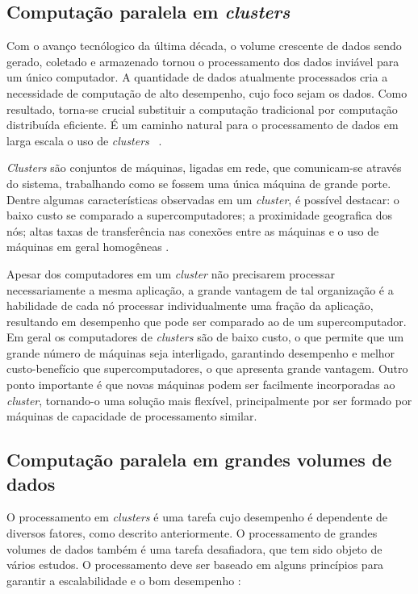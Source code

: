 \subsection{Computação paralela em \textit{clusters}}
Com o avanço tecnólogico da última década, o volume crescente de dados sendo gerado, coletado e armazenado tornou o processamento dos dados inviável para um único computador. A quantidade de dados atualmente processados cria a necessidade de computação de alto desempenho, cujo foco sejam os dados.  Como resultado, torna-se crucial substituir a computação tradicional por computação distribuída eficiente. 
É um caminho natural para o processamento de dados em larga escala o uso de \textit{clusters} ~\cite{Lin:2010}.

\textit{Clusters} são conjuntos de máquinas, ligadas em rede, que comunicam-se através do sistema, trabalhando como se fossem uma única máquina de grande porte. 
Dentre algumas características observadas em um \textit{cluster}, é possível destacar: o baixo custo se comparado a supercomputadores; a proximidade geografica dos nós; altas taxas de transferência nas conexões entre as máquinas e o uso de máquinas em geral homogêneas \cite{Toth:2008}.

Apesar dos computadores em um \textit{cluster} não precisarem processar necessariamente a mesma aplicação, a grande vantagem de tal organização é a habilidade de cada nó processar individualmente uma fração da aplicação, resultando em desempenho que pode ser comparado ao de um supercomputador.
Em geral os computadores de \textit{clusters} são de baixo custo, o que permite que um grande número de máquinas seja interligado, garantindo desempenho e melhor custo-benefício que supercomputadores, o que apresenta grande vantagem. Outro ponto importante é que novas máquinas podem ser facilmente incorporadas  ao \textit{cluster}, tornando-o uma solução mais flexível, principalmente por ser formado por máquinas de capacidade de processamento similar.

%
%
%


\subsection{Computação paralela em grandes volumes de dados}
O processamento em \textit{clusters} é uma tarefa cujo desempenho é dependente de diversos fatores, como descrito anteriormente. O processamento de grandes volumes de dados também é uma tarefa desafiadora, que tem sido objeto de vários estudos. O processamento deve ser baseado em alguns princípios para garantir a escalabilidade e o bom desempenho \cite{Bryant:2011}:



